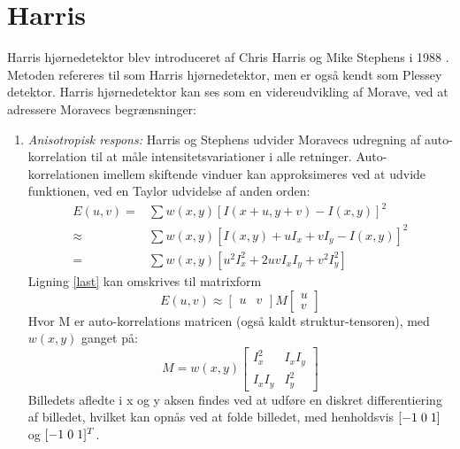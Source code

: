 \section{Harris}\label{sec:harris}
Harris hjørnedetektor blev introduceret af Chris Harris og Mike Stephens i 1988 \cite{harris}. Metoden refereres til som Harris hjørnedetektor, men er også kendt som Plessey detektor. Harris hjørnedetektor kan ses som en videreudvikling af Morave, ved at adressere Moravecs begrænsninger:
\begin{enumerate}
\item{ \textit{Anisotropisk respons:} Harris og Stephens udvider Moravecs udregning af auto-korrelation til at måle intensitetsvariationer i alle retninger. Auto-korrelationen imellem skiftende vinduer kan approksimeres ved at udvide funktionen, ved en Taylor udvidelse af anden orden:
\begin{subequations}
\begin{align}
E(u,v) = & \sum w(x,y)[I(x + u, y + v) - I(x,y)]^2 \\
\approx & \sum w(x,y)[I(x,y) + uI_x  + vI_y - I(x,y)]^2 \\
= & \sum w(x,y)[u^2I_x^2 + 2uvI_xI_y + v^2I_y^2]  \label{last}
\end{align}
\end{subequations}
Ligning \eqref{last} kan omskrives til matrixform
\begin{equation}
E(u,v) \approx
\begin{bmatrix}
        u & v
     \end{bmatrix}
M
\begin{bmatrix}
        u \\
        v
     \end{bmatrix}
\end{equation} 
Hvor M er auto-korrelations matricen (også kaldt struktur-tensoren), med $w(x,y)$ ganget på:
\begin{equation}
M = w(x,y) 
\begin{bmatrix}
	I_x^2 & I_xI_y \\
	I_xI_y & I_y^2
\end{bmatrix}
\label{structens}
\end{equation}
Billedets afledte i x og y aksen findes ved at udføre en diskret differentiering af billedet, hvilket kan opnås
ved at folde billedet, med henholdsvis $[-1 \hspace{0.1cm} 0 \hspace{0.1cm} 1]$ og $[-1 \hspace{0.1cm} 0 \hspace{0.1cm} 1]^T$. }

\end{enumerate}
